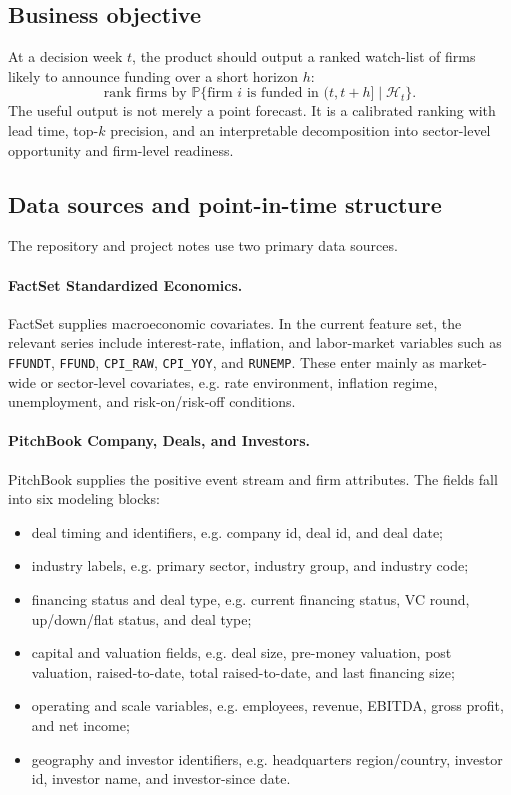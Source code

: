 \documentclass[11pt]{article}
\theoremstyle{plain}
\theoremstyle{definition}
\theoremstyle{remark}
\newcommand{\Prob}{\mathbb{P}}
\newcommand{\cH}{\mathcal{H}}
\newcommand{\code}[1]{\texttt{#1}}
\begin{document}
\subsection{Business objective}
At a decision week $t$, the product should output a ranked watch-list of firms likely to announce funding over a short horizon $h$:
\[
\text{rank firms by } \Prob\{\text{firm } i \text{ is funded in } (t,t+h]\mid \cH_t\}.
\]
The useful output is not merely a point forecast. It is a calibrated ranking with lead time, top-$k$ precision, and an interpretable decomposition into sector-level opportunity and firm-level readiness.

\subsection{Data sources and point-in-time structure}
The repository and project notes use two primary data sources.

\paragraph{FactSet Standardized Economics.}
FactSet supplies macroeconomic covariates. In the current feature set, the relevant series include interest-rate, inflation, and labor-market variables such as \code{FFUNDT}, \code{FFUND}, \code{CPI\_RAW}, \code{CPI\_YOY}, and \code{RUNEMP}. These enter mainly as market-wide or sector-level covariates, e.g. rate environment, inflation regime, unemployment, and risk-on/risk-off conditions.

\paragraph{PitchBook Company, Deals, and Investors.}
PitchBook supplies the positive event stream and firm attributes. The fields fall into six modeling blocks:
\begin{itemize}[leftmargin=1.5em,itemsep=1pt]
\item deal timing and identifiers, e.g. company id, deal id, and deal date;
\item industry labels, e.g. primary sector, industry group, and industry code;
\item financing status and deal type, e.g. current financing status, VC round, up/down/flat status, and deal type;
\item capital and valuation fields, e.g. deal size, pre-money valuation, post valuation, raised-to-date, total raised-to-date, and last financing size;
\item operating and scale variables, e.g. employees, revenue, EBITDA, gross profit, and net income;
\item geography and investor identifiers, e.g. headquarters region/country, investor id, investor name, and investor-since date.
\end{itemize}
\end{document}
